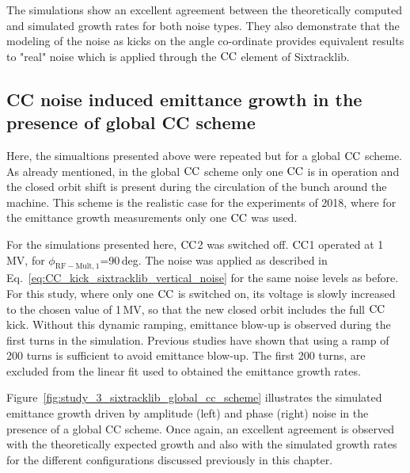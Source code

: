 The simulations show an excellent agreement between the theoretically computed and simulated growth rates for both noise types. They also demonstrate that the modeling of the noise as kicks on the angle co-ordinate provides equivalent results to "real" noise which is applied through the ${\mathrm{CC}}$ element of Sixtracklib.

\subsection{CC noise induced emittance growth in the presence of global CC scheme}\label{subsec:global_CC_sixtracklib}
Here, the simualtions presented above were repeated but for a global ${\mathrm{CC}}$ scheme. As already mentioned, in the global ${\mathrm{CC}}$ scheme only one ${\mathrm{CC}}$ is in operation and the closed orbit shift is present during the circulation of the bunch around the machine. This scheme is the realistic case for the experiments of 2018, where for the emittance growth measurements only one ${\mathrm{CC}}$ was used.

For the simulations presented here, ${\mathrm{CC}}$2 was switched off. ${\mathrm{CC}}$1 operated at 1\,MV, for $\phi_\mathrm{RF-Mult, 1}$=90\,deg. The noise was applied as described in Eq.~\eqref{eq:CC_kick_sixtracklib_vertical_noise} for the same noise levels as before. For this study, where only one ${\mathrm{CC}}$ is switched on, its voltage is slowly increased to the chosen value of 1\,MV, so that the new closed orbit includes the full ${\mathrm{CC}}$ kick. Without this dynamic ramping, emittance blow-up is observed during the first turns in the simulation. Previous studies have shown that using a ramp of 200 turns is sufficient to avoid emittance blow-up.
The first 200 turns, are excluded from the linear fit used to obtained the emittance growth rates. %

Figure~\ref{fig:study_3_sixtracklib_global_cc_scheme} illustrates the simulated emittance growth driven by amplitude (left) and phase (right) noise in the presence of a global CC scheme. Once again, an excellent agreement is observed with the theoretically expected growth and also with the simulated growth rates for the different configurations discussed previously in this chapter. %

